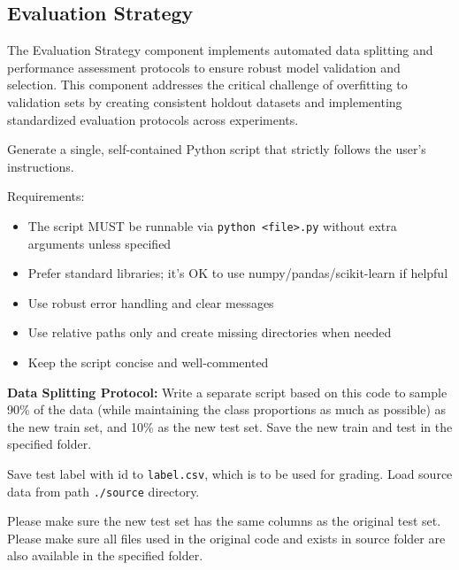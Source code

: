 \subsection{Evaluation Strategy}

The Evaluation Strategy component implements automated data splitting and performance assessment protocols to ensure robust model validation and selection. This component addresses the critical challenge of overfitting to validation sets by creating consistent holdout datasets and implementing standardized evaluation protocols across experiments.

\begin{tcolorbox}[
  colback=gray!5,
  colframe=gray!80,
  title=Automated Data Sampling –--- Evaluation Strategy Component,
  breakable
]
Generate a single, self-contained Python script that strictly follows the user's instructions.

Requirements:
\begin{itemize}
    \item The script MUST be runnable via \texttt{python <file>.py} without extra arguments unless specified
    \item Prefer standard libraries; it's OK to use numpy/pandas/scikit-learn if helpful
    \item Use robust error handling and clear messages
    \item Use relative paths only and create missing directories when needed
    \item Keep the script concise and well-commented
\end{itemize}

\textbf{Data Splitting Protocol:}
Write a separate script based on this code to sample 90\% of the data (while maintaining the class proportions as much as possible) as the new train set, and 10\% as the new test set. Save the new train and test in the specified folder.

Save test label with id to \texttt{label.csv}, which is to be used for grading. Load source data from path \texttt{./source} directory.

Please make sure the new test set has the same columns as the original test set. Please make sure all files used in the original code and exists in source folder are also available in the specified folder.
\end{tcolorbox}

